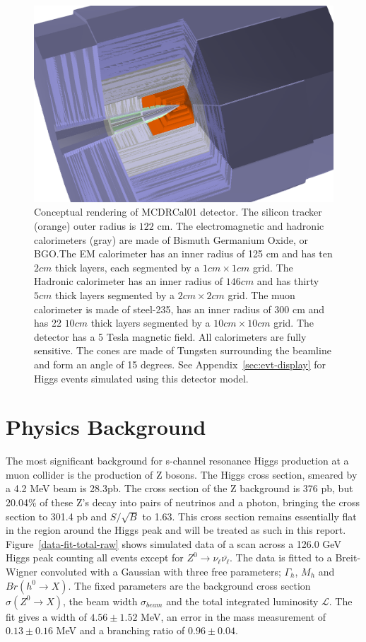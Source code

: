 \documentclass[a4paper]{article}
\begin{document}
\begin{figure}
	\includegraphics[width=\textwidth]{mcdrcal01}
	\caption{Conceptual rendering of MCDRCal01 detector. The silicon tracker (orange) outer radius is $122$ cm. The electromagnetic and hadronic calorimeters (gray) are made of Bismuth Germanium Oxide, or BGO.\@ The EM calorimeter has an inner radius of 125 cm and has ten $2 cm$ thick layers, each segmented by a $1 cm \times 1 cm$ grid. The Hadronic calorimeter has an inner radius of $146 cm$ and has thirty$ 5 cm$ thick layers segmented by a $2 cm \times 2 cm$ grid. The muon calorimeter is made of steel-235, has an inner radius of 300 cm and has 22 $10 cm$ thick layers segmented by a $10 cm \times 10 cm$ grid. The detector has a 5 Tesla magnetic field. All calorimeters are fully sensitive. The cones are made of Tungsten surrounding the beamline and form an angle of 15 degrees. See Appendix~\ref{sec:evt-display} for Higgs events simulated using this detector model.\label{fig:detector}}
\end{figure}

\section{Physics Background}
The most significant background for s-channel resonance Higgs production at a muon collider is the production of Z bosons. The Higgs cross section, smeared by a 4.2 MeV beam is 28.3pb. The cross section of the Z background is 376 pb, but 20.04\% of these Z's decay into pairs of neutrinos and a photon, bringing the cross section to 301.4 pb and $S/\sqrt{B}$ to 1.63. This cross section remains essentially flat in the region around the Higgs peak and will be treated as such in this report. Figure~\ref{data-fit-total-raw} shows simulated data of a scan across a 126.0 GeV Higgs peak counting all events except for $Z^0\rightarrow \nu_{\ell}\bar{\nu_{\ell}}$. The data is fitted to a Breit-Wigner convoluted with a Gaussian with three free parameters; $\Gamma_h$, $M_h$ and $Br(h^0\rightarrow X)$. The fixed parameters are the background cross section $\sigma(Z^0\rightarrow X)$, the beam width $\sigma_{beam}$ and the total integrated luminosity $\mathcal{L}$. The fit gives a width of $4.56\pm 1.52$ MeV, an error in the mass measurement of $0.13\pm0.16$ MeV and a branching ratio of $0.96\pm0.04$. 
\end{document}
